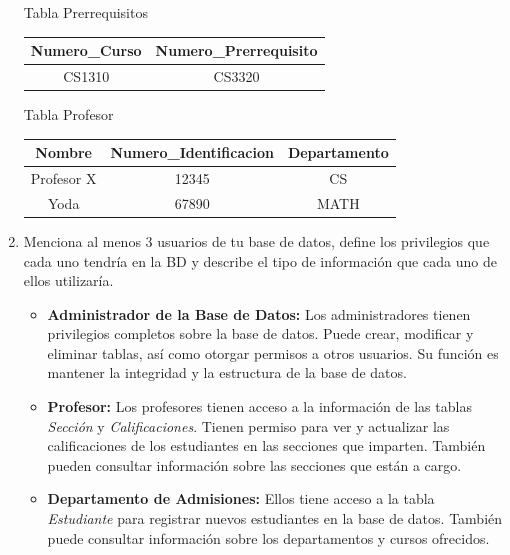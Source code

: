 \documentclass[a4paper,12pt]{article}
\begin{document}
\begin{enumerate}
    \vspace{10mm}
    \thispagestyle{fancy} %
    \begin{minipage}[c]{0.75\textwidth}        
        Tabla Prerrequisitos \\
  
        \begin{tabular}{|c|c|}
        \hline
          Numero\_Curso & Numero\_Prerrequisito \\ \hline
          CS1310 & CS3320 \\
        \hline
        \end{tabular}    
    \end{minipage}
  
    \vspace{10mm}
    \thispagestyle{fancy} %
    \begin{minipage}[c]{0.75\textwidth}        
        Tabla Profesor\\
  
        \begin{tabular}{|c|c|c|}
        \hline
          Nombre & Numero\_Identificacion & Departamento \\ \hline
          Profesor X & 12345 & CS \\ \hline
          Yoda & 67890 & MATH \\
        \hline
        \end{tabular}    
    \end{minipage}

    \item \textcolor{sun}{Menciona al menos 3 usuarios de tu base de datos, define los privilegios que cada
    uno tendría en la BD y describe el tipo de información que cada uno de ellos
    utilizaría.}

    \begin{itemize}
      \item \textcolor{Peach}{\textbf{Administrador de la Base de Datos:}} Los administradores tienen privilegios completos sobre la base de datos. Puede crear, modificar y eliminar tablas, así como otorgar permisos a otros usuarios. Su función es mantener la integridad y la estructura de la base de datos.
    
      \item \textcolor{Peach}{\textbf{Profesor:}} Los profesores tienen acceso a la información de las tablas \textit{Sección} y \textit{Calificaciones}. Tienen permiso para ver y actualizar las calificaciones de los estudiantes en las secciones que imparten. También pueden consultar información sobre las secciones que están a cargo.      
    
      \item \textcolor{Peach}{\textbf{Departamento de Admisiones:}} Ellos tiene acceso a la tabla \textit{Estudiante} para registrar nuevos estudiantes en la base de datos. También puede consultar información sobre los departamentos y cursos ofrecidos.          
    \end{itemize}
  
\end{enumerate}
\thispagestyle{fancy} %
\end{document}
